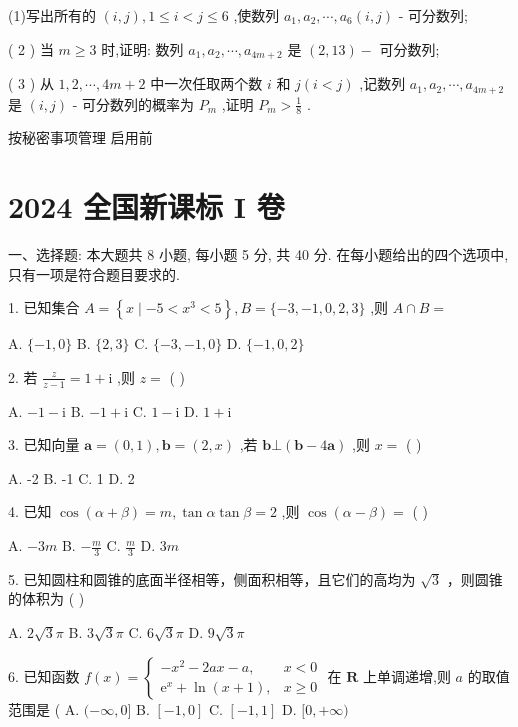 \documentclass[10pt]{article}
\begin{document}
(1)写出所有的 \(\left( {i,j}\right) ,1 \leq  i < j \leq  6\) ,使数列 \({a}_{1},{a}_{2},\cdots ,{a}_{6}\left( {i,j}\right)\) - 可分数列;

( 2 ) 当 \(m \geq  3\) 时,证明: 数列 \({a}_{1},{a}_{2},\cdots ,{a}_{{4m} + 2}\) 是 \(\left( {2,{13}}\right)  -\) 可分数列;

( 3 ) 从 \(1,2,\cdots ,{4m} + 2\) 中一次任取两个数 \(i\) 和 \(j\left( {i < j}\right)\) ,记数列 \({a}_{1},{a}_{2},\cdots ,{a}_{{4m} + 2}\) 是 \(\left( {i,j}\right)\) - 可分数列的概率为 \({P}_{m}\) ,证明 \({P}_{m} > \frac{1}{8}\) .

按秘密事项管理  启用前

\section*{2024 全国新课标 I 卷}

一、选择题: 本大题共 8 小题, 每小题 5 分, 共 40 分. 在每小题给出的四个选项中, 只有一项是符合题目要求的.

1. 已知集合 \(A = \left\{  {x \mid   - 5 < {x}^{3} < 5}\right\}  ,B = \{  - 3, - 1,0,2,3\}\) ,则 \(A \cap  B =\)

A. \(\{  - 1,0\}\) B. \(\{ 2,3\}\) C. \(\{  - 3, - 1,0\}\) D. \(\{  - 1,0,2\}\)

2. 若 \(\frac{z}{z - 1} = 1 + \mathrm{i}\) ,则 \(z =\) ( )

A. \(- 1 - \mathrm{i}\) B. \(- 1 + \mathrm{i}\) C. \(1 - \mathrm{i}\) D. \(1 + \mathrm{i}\)

3. 已知向量 \(\mathbf{a} = \left( {0,1}\right) ,\mathbf{b} = \left( {2,x}\right)\) ,若 \(\mathbf{b} \bot  \left( {\mathbf{b} - 4\mathbf{a}}\right)\) ,则 \(x =\) ( )

A. -2 B. -1 C. 1 D. 2

4. 已知 \(\cos \left( {\alpha  + \beta }\right)  = m,\tan \alpha \tan \beta  = 2\) ,则 \(\cos \left( {\alpha  - \beta }\right)  =\) ( )

A. \(- {3m}\) B. \(- \frac{m}{3}\) C. \(\frac{m}{3}\) D. \({3m}\)

5. 已知圆柱和圆锥的底面半径相等，侧面积相等，且它们的高均为 \(\sqrt{3}\) ，则圆锥的体积为 ( )

A. \(2\sqrt{3}\pi\) B. \(3\sqrt{3}\pi\) C. \(6\sqrt{3}\pi\) D. \(9\sqrt{3}\pi\)

6. 已知函数 \(f\left( x\right)  = \left\{  \begin{array}{ll}  - {x}^{2} - {2ax} - a, & x < 0 \\  {\mathrm{e}}^{x} + \ln \left( {x + 1}\right) , & x \geq  0 \end{array}\right.\) 在 \(\mathbf{R}\) 上单调递增,则 \(a\) 的取值范围是 ( A. \(( - \infty ,0\rbrack\) B. \(\left\lbrack  {-1,0}\right\rbrack\) C. \(\left\lbrack  {-1,1}\right\rbrack\) D. \(\lbrack 0, + \infty )\)
\end{document}
